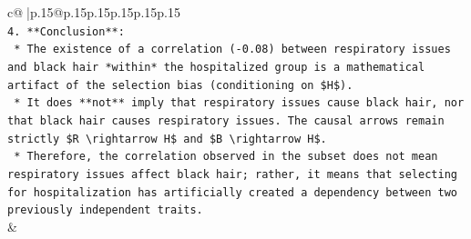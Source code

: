 \documentclass{article}
\begin{document}
{\begin{supertabular}{c@{$\;$}|p{.15\linewidth}@{}p{.15\linewidth}p{.15\linewidth}p{.15\linewidth}p{.15\linewidth}p{.15\linewidth}}
{{{\\ 
\texttt{4.  **Conclusion**:} \\
\texttt{    *   The existence of a correlation ({-}0.08) between respiratory issues and black hair *within* the hospitalized group is a mathematical artifact of the selection bias (conditioning on \$H\$).} \\
\texttt{    *   It does **not** imply that respiratory issues cause black hair, nor that black hair causes respiratory issues. The causal arrows remain strictly \$R \textbackslash{}rightarrow H\$ and \$B \textbackslash{}rightarrow H\$.} \\
\texttt{    *   Therefore, the correlation observed in the subset does not mean respiratory issues affect black hair; rather, it means that selecting for hospitalization has artificially created a dependency between two previously independent traits.} \\
            }
        }
    }
    & \\ \\


\end{supertabular}}
\end{document}

